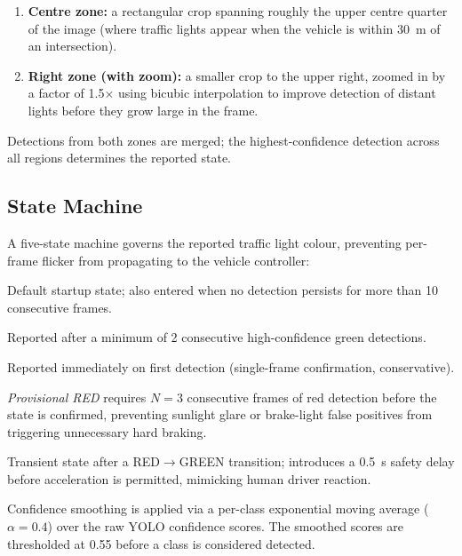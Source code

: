 \documentclass[12pt,a4paper]{article}
\begin{document}
\begin{enumerate}[nosep,label=\textbf{\arabic*.}]
  \item \textbf{Centre zone:} a rectangular crop spanning roughly the upper
        centre quarter of the image (where traffic lights appear when the
        vehicle is within \SI{30}{\metre} of an intersection).
  \item \textbf{Right zone (with zoom):} a smaller crop to the upper right,
        zoomed in by a factor of 1.5$\times$ using bicubic interpolation to
        improve detection of distant lights before they grow large in the
        frame.
\end{enumerate}

\noindent
Detections from both zones are merged; the highest-confidence detection across
all regions determines the reported state.

\subsection{State Machine}
\label{subsec:tl_state}

A five-state machine governs the reported traffic light colour, preventing
per-frame flicker from propagating to the vehicle controller:

\begin{description}[nosep, leftmargin=2em]
  \item[\texttt{UNKNOWN}] Default startup state; also entered when no
        detection persists for more than 10 consecutive frames.
  \item[\texttt{GREEN}]  Reported after a minimum of 2 consecutive
        high-confidence green detections.
  \item[\texttt{YELLOW}] Reported immediately on first detection (single-frame
        confirmation, conservative).
  \item[\texttt{RED}]    \emph{Provisional RED} requires $N=3$ consecutive
        frames of red detection before the state is confirmed, preventing
        sunlight glare or brake-light false positives from triggering
        unnecessary hard braking.
  \item[\texttt{GREEN-RESUME}] Transient state after a RED$\to$GREEN
        transition; introduces a \SI{0.5}{\second} safety delay before
        acceleration is permitted, mimicking human driver reaction.
\end{description}

\noindent
Confidence smoothing is applied via a per-class exponential moving average
($\alpha=0.4$) over the raw YOLO confidence scores.  The smoothed scores are
thresholded at 0.55 before a class is considered detected.
\end{document}
